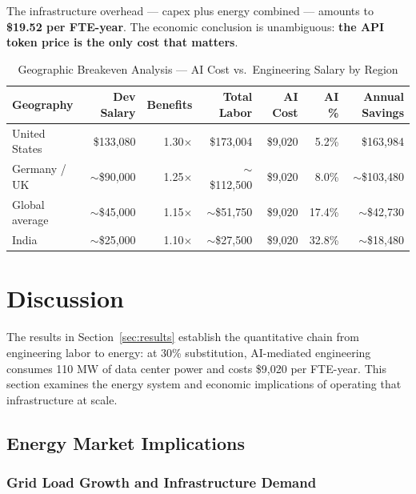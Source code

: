 \documentclass{article}
\begin{document}
The infrastructure overhead --- capex plus energy combined --- amounts to \textbf{\$19.52
per FTE-year}. The economic conclusion is unambiguous: \textbf{the API token price is the
only cost that matters}.

\begin{table}[ht]
\centering
\caption{Geographic Breakeven Analysis --- AI Cost vs.\ Engineering Salary by Region}
\label{tab:geographic}
\small
\begin{tabular}{@{}lrrrrrr@{}}
\toprule
\textbf{Geography} & \textbf{Dev Salary} & \textbf{Benefits} & \textbf{Total Labor} & \textbf{AI Cost} & \textbf{AI \%} & \textbf{Annual Savings} \\
\midrule
United States & \$133,080 & 1.30$\times$ & \$173,004 & \$9,020 & 5.2\% & \$163,984 \\
Germany / UK & $\sim$\$90,000 & 1.25$\times$ & $\sim$\$112,500 & \$9,020 & 8.0\% & $\sim$\$103,480 \\
Global average & $\sim$\$45,000 & 1.15$\times$ & $\sim$\$51,750 & \$9,020 & 17.4\% & $\sim$\$42,730 \\
India & $\sim$\$25,000 & 1.10$\times$ & $\sim$\$27,500 & \$9,020 & 32.8\% & $\sim$\$18,480 \\
\bottomrule
\end{tabular}
\end{table}

\section{Discussion}
\label{sec:discussion}

\label{sec:markets}

The results in Section~\ref{sec:results} establish the quantitative chain from engineering
labor to energy: at 30\% substitution, AI-mediated engineering consumes 110 MW of data
center power and costs \$9,020 per FTE-year. This section examines the energy system
and economic implications of operating that infrastructure at scale.

\subsection{Energy Market Implications}
\label{sec:energy-market}

\subsubsection{Grid Load Growth and Infrastructure Demand}
\end{document}
